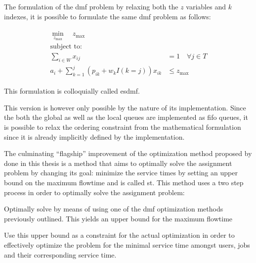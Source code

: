 The formulation of the \gls{dmf} problem by relaxing both the $z$ variables and $k$ indexes, it is possible to formulate the same \gls{dmf} problem as follows:

\begin{align}
	\begin{split}
	    \min_{z_{\text{max}}} \quad z_{\text{max}}\\
	    \text{subject to:} \\
	    \sum_{i \in W} x_{ij} &= 1 \quad \forall j \in T\\
	    a_i + \sum_{k=1}^j (p_{ik} + w_k I(k=j))x_{ik} &\leq z_{\text{max}}
	\end{split}
\end{align}

This formulation is colloquially called \gls{esdmf}.

This version is however only possible by the nature of its implementation. Since the both the global as well as the local queues are implemented as \gls{fifo} queues, it is possible to relax the ordering constraint from the mathematical formulation since it is already implicitly defined by the implementation.

The culminating ``flagship'' improvement of the optimization method proposed by \citet{Zeng2005} done in this thesis is a method that aims to optimally solve the assignment problem by changing its goal: minimize the service times by setting an upper bound on the maximum flowtime and is called \gls{st}. This method uses a two step process in order to optimally solve the assignment problem:
\begin{enumerate*}
	\item Optimally solve by means of using one of the \gls{dmf} optimization methods previously outlined. This yields an upper bound for the maximum flowtime
	\item Use this upper bound as a constraint for the actual optimization in order to effectively optimize the problem for the minimal service time amongst users, jobs and their corresponding service time.
\end{enumerate*}

